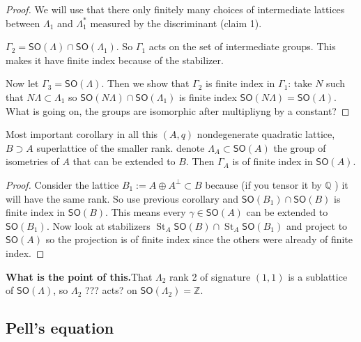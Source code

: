 \begin{proof}\leavevmode
	We will use that there only finitely many choices of intermediate lattices between  $\Lambda_1$ and $\Lambda_1^*$ measured by the discriminant (claim 1).

	$\Gamma_2=\mathsf{SO}(\Lambda)\cap \mathsf{SO}(\Lambda_1)$. So $\Gamma_1$ acts on the set of intermediate groups. This makes it have finite index because of the stabilizer.

	Now let $\Gamma_3=\mathsf{SO}(\Lambda)$. Then we show that $\Gamma_2$ is finite index in $\Gamma_1$: take $N$ such that $N\Lambda\subset \Lambda_1$ so $\mathsf{SO}(N\Lambda)\cap \mathsf{SO}(\Lambda_1)$ is finite index $\mathsf{SO}(N\Lambda)=\mathsf{SO}(\Lambda)$. {\color{4}What is going on, the groups are isomorphic after multipliyng by a constant?}
\end{proof}

\begin{idea2}{Most important corollary in all this}\leavevmode
	$(A,q)$ nondegenerate quadratic lattice,  $B \supset A$ superlattice of the {\color{8}smaller} rank. denote $\Lambda_A \subset \mathsf{SO}(A)$ the group of isometries of $A$ that can be extended to $B$. {\color{4}Then $\Gamma_A$ is of finite index in $\mathsf{SO}(A)$}.
\end{idea2}

\begin{proof}\leavevmode
	Consider the lattice $B_1:=A \oplus A^\perp \subset B$ because (if you tensor it by $\mathbb{Q}$ ) it will have the same rank. So use previous corollary and $\mathsf{SO}(B_1)\cap \mathsf{SO}(B)$ is finite index in $\mathsf{SO}(B)$. This means every $\gamma\in\mathsf{SO}(A)$ can be extended to $\mathsf{SO}(B_1)$. Now look at stabilizers $\operatorname{S t }_A\mathsf{SO}(B) \cap \operatorname{S t}_A\mathsf{SO}(B_1)$ and project to $\mathsf{SO}(A)$ so the projection is of finite index since the others were already of finite index.
\end{proof}

{\color{8}\bfseries What is the point of this.}\hspace{.5em}That $\Lambda_2$ rank 2 of signature $(1,1)$ is a sublattice of  $\mathsf{SO}(\Lambda)$, so $\Lambda_2$ ??? acts? on $\mathsf{SO}(\Lambda_2)=\mathbb{Z}$.

\subsection{Pell's equation}

